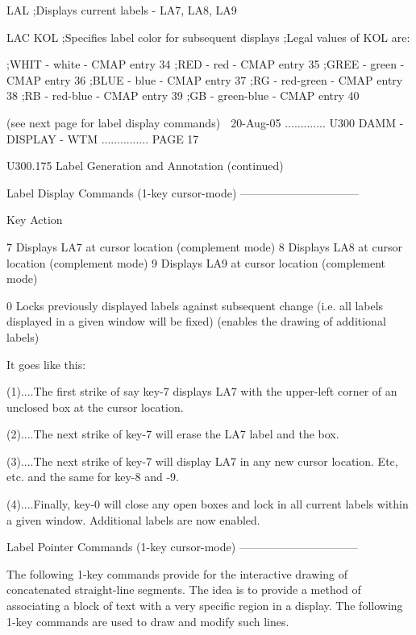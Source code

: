    LAL         ;Displays current labels - LA7, LA8, LA9
 
   LAC  KOL    ;Specifies label color for subsequent displays
               ;Legal values of KOL are:
 
               ;WHIT - white      - CMAP entry 34
               ;RED  - red        - CMAP entry 35
               ;GREE - green      - CMAP entry 36
               ;BLUE - blue       - CMAP entry 37
               ;RG   - red-green  - CMAP entry 38
               ;RB   - red-blue   - CMAP entry 39
               ;GB   - green-blue - CMAP entry 40
 
 
                   (see next page for label display commands)
    
   20-Aug-05 ............. U300  DAMM - DISPLAY - WTM ............... PAGE  17
 
 
 
   U300.175  Label Generation and Annotation (continued)
 
   Label Display Commands (1-key cursor-mode) --------------------------------
 
   Key      Action
 
   7        Displays LA7 at cursor location (complement mode)
   8        Displays LA8 at cursor location (complement mode)
   9        Displays LA9 at cursor location (complement mode)
 
   0        Locks previously displayed labels against subsequent change
            (i.e. all labels displayed in a given window will be fixed)
            (enables the drawing of additional labels)
 
   It goes like this:
 
   (1)....The first strike of say  key-7  displays  LA7  with  the  upper-left
          corner of an unclosed box at the cursor location.
 
   (2)....The next strike of key-7 will erase the LA7 label and the box.
 
   (3)....The  next  strike  of  key-7  will  display  LA7  in  any new cursor
          location. Etc, etc. and the same for key-8 and -9.
 
   (4)....Finally, key-0 will close any open boxes and  lock  in  all  current
          labels within a given window. Additional labels are now enabled.
 
   Label Pointer Commands (1-key cursor-mode) --------------------------------
 
   The  following  1-key  commands  provide  for  the  interactive  drawing of
   concatenated straight-line segments. The idea is to  provide  a  method  of
   associating  a  block of text with a very specific region in a display. The
   following 1-key commands are used to draw and modify such lines.
 
